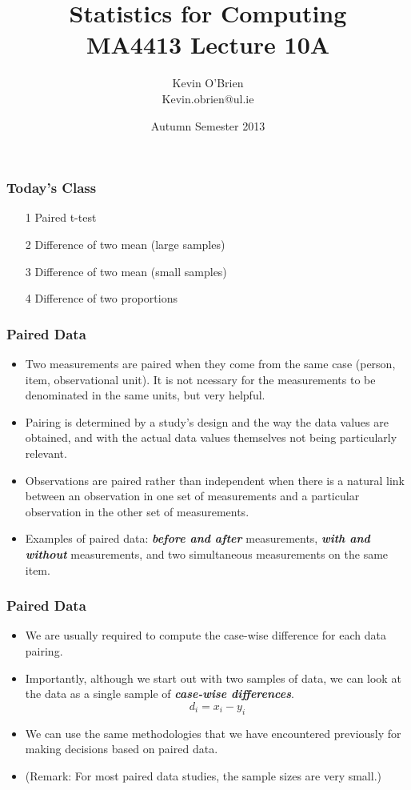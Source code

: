 \documentclass[a4]{beamer}
\title[MA4413]{Statistics for Computing \\ {\normalsize MA4413 Lecture 10A}}
\author[Kevin O'Brien]{Kevin O'Brien \\ {\scriptsize Kevin.obrien@ul.ie}}
\date{Autumn Semester 2013}
\institute[Maths \& Stats]{Dept. of Mathematics \& Statistics, \\ University \textit{of} Limerick}
\begin{document}
\begin{frame}
\titlepage
\end{frame}
\begin{frame}
\frametitle{Today's Class}
\begin{itemize}
\item[1] Paired t-test
\item[2] Difference of two mean (large samples)
\item[3] Difference of two mean (small samples)
\item[4] Difference of two proportions
\end{itemize}

\end{frame}

\begin{frame}
\frametitle{Paired Data}
\begin{itemize}
\item Two measurements are paired when they come from the same case (person, item, observational unit). It is not ncessary for the measurements to be denominated in the same units, but very helpful.
\item Pairing is determined by a study's design and the way the data values are obtained, and with the actual data values themselves not being particularly relevant. 
\item Observations are paired rather than independent when there is a natural link between an observation in one set of measurements and a particular observation in the other set of measurements.
\item Examples of paired data: \textit{\textbf{before and after}} measurements,\textit{ \textbf{with and without}} measurements, and two simultaneous measurements on the same item.
\end{itemize}
\end{frame}
\begin{frame}
\frametitle{Paired Data}
\begin{itemize}
\item We are usually required to compute the case-wise difference for each data pairing.
\item Importantly, although we start out with two samples of data, we can look at the data as a single sample of \textit{\textbf{case-wise differences}}.
\[d_i = x_i-y_i\]
\item We can use the same methodologies that we have encountered previously for making decisions based on paired data.
\item (Remark: For most paired data studies, the sample sizes are very small.)
\end{itemize}
\end{frame}
\end{document}

